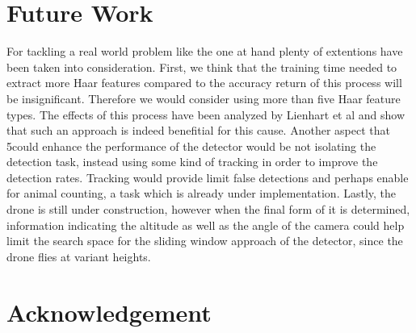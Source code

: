 \documentclass[11pt]{article}
\begin{document}
\section{Future Work}
For tackling a real world problem like the one at hand plenty of extentions have been taken into consideration. First, we think that the training time needed to extract more Haar features compared to the accuracy return of this process will be insignificant. Therefore we would consider using more than five Haar feature types. The effects of this process have been analyzed by Lienhart et al \cite{Lienhart02anextended} and show that such an approach is indeed benefitial for this cause. Another aspect that 5could enhance the performance of the detector would be not isolating the detection task, instead using some kind of tracking in order to improve the detection rates. Tracking would provide limit false detections and perhaps enable for animal counting, a task which is already under implementation. Lastly, the drone is still under construction, however when the final form of it is determined, information indicating the altitude as well as the angle of the camera could help limit the search space for the sliding window approach of the detector, since the drone flies at variant heights. 


\section{Acknowledgement}


\end{document}
